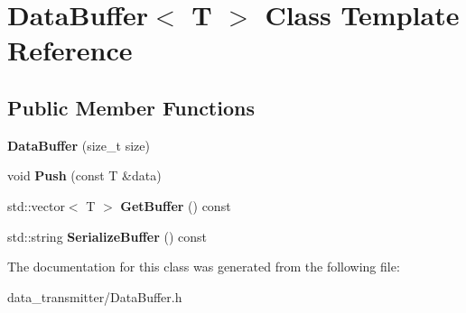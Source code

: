 \hypertarget{classDataBuffer}{\section{Data\-Buffer$<$ T $>$ Class Template Reference}
\label{classDataBuffer}
}
\subsection*{Public Member Functions}
\begin{DoxyCompactItemize}
\item 
\hypertarget{classDataBuffer_aa51e4cb7147b6d341aff27f247ff867a}{{\bfseries Data\-Buffer} (size\-\_\-t size)}\label{classDataBuffer_aa51e4cb7147b6d341aff27f247ff867a}

\item 
\hypertarget{classDataBuffer_ac416fee4f7f5708cd747baa091701631}{void {\bfseries Push} (const T \&data)}\label{classDataBuffer_ac416fee4f7f5708cd747baa091701631}

\item 
\hypertarget{classDataBuffer_ac2fb6864ff79083177fa279a781bc532}{std\-::vector$<$ T $>$ {\bfseries Get\-Buffer} () const }\label{classDataBuffer_ac2fb6864ff79083177fa279a781bc532}

\item 
\hypertarget{classDataBuffer_a2fbccd0b28adf4594c1201ce7daee0bf}{std\-::string {\bfseries Serialize\-Buffer} () const }\label{classDataBuffer_a2fbccd0b28adf4594c1201ce7daee0bf}

\end{DoxyCompactItemize}


The documentation for this class was generated from the following file\-:\begin{DoxyCompactItemize}
\item 
data\-\_\-transmitter/Data\-Buffer.\-h\end{DoxyCompactItemize}
